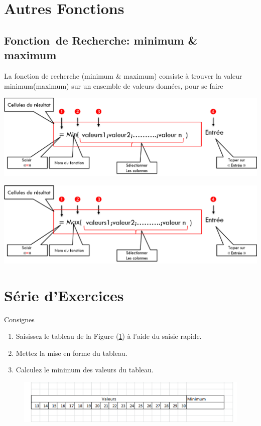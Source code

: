 \section{Autres Fonctions}
\subsection{Fonction de Recherche: minimum \& maximum }
La fonction de recherche (minimum \& maximum) consiste à trouver la valeur minimum(maximum) sur un ensemble de valeurs données, pour se faire
\begin{center}  
	\includegraphics[scale=0.2,width= \linewidth]{img/minimum} 
\end{center}

\begin{center}  
	\includegraphics[scale=0.2,width= \linewidth]{img/maximum} 
\end{center}

\section{Série d'Exercices}

\begin{exercice}\label{ex11}
	Consignes 
	\begin{enumerate}		
		\item  Saisissez le tableau  de la Figure (\ref{exo11}) à l'aide du saisie rapide.  				
		\item  Mettez la mise en forme  du tableau.
		\item  Calculez le minimum des valeurs du tableau.
	\end{enumerate}	
\end{exercice}
\begin{figure}[H]
	\centering
	\includegraphics[scale=0.2,width= \linewidth]{img/ex011}
	 \label{exo11}
\end{figure}

